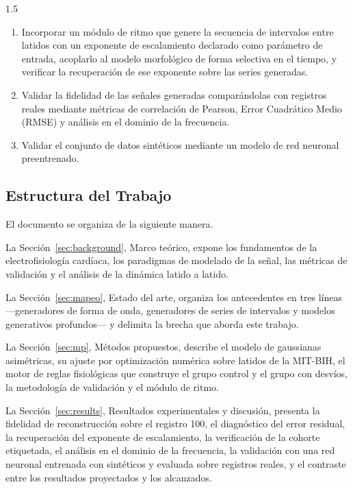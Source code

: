 \begin{spacing}{1.5}
\begin{enumerate}
\item Incorporar un módulo de ritmo que genere la secuencia de intervalos entre latidos con un exponente de escalamiento declarado como parámetro de entrada, acoplarlo al modelo morfológico de forma selectiva en el tiempo, y verificar la recuperación de ese exponente sobre las series generadas.

\item Validar la fidelidad de las señales generadas comparándolas con registros reales mediante métricas de correlación de Pearson, Error Cuadrático Medio (RMSE) y análisis en el dominio de la frecuencia.

\item Validar el conjunto de datos sintéticos mediante un modelo de red neuronal preentrenado.

\end{enumerate}

\subsection{Estructura del Trabajo}

El documento se organiza de la siguiente manera.

La Sección~\ref{sec:background}, Marco teórico, expone los fundamentos de la electrofisiología cardíaca, los paradigmas de modelado de la señal, las métricas de validación y el análisis de la dinámica latido a latido.

La Sección~\ref{sec:mapeo}, Estado del arte, organiza los antecedentes en tres líneas ---generadores de forma de onda, generadores de series de intervalos y modelos generativos profundos--- y delimita la brecha que aborda este trabajo.

La Sección~\ref{sec:mp}, Métodos propuestos, describe el modelo de gaussianas asimétricas, su ajuste por optimización numérica sobre latidos de la MIT-BIH, el motor de reglas fisiológicas que construye el grupo control y el grupo con desvíos, la metodología de validación y el módulo de ritmo.

La Sección~\ref{sec:results}, Resultados experimentales y discusión, presenta la fidelidad de reconstrucción sobre el registro 100, el diagnóstico del error residual, la recuperación del exponente de escalamiento, la verificación de la cohorte etiquetada, el análisis en el dominio de la frecuencia, la validación con una red neuronal entrenada con sintéticos y evaluada sobre registros reales, y el contraste entre los resultados proyectados y los alcanzados.


\end{spacing}
